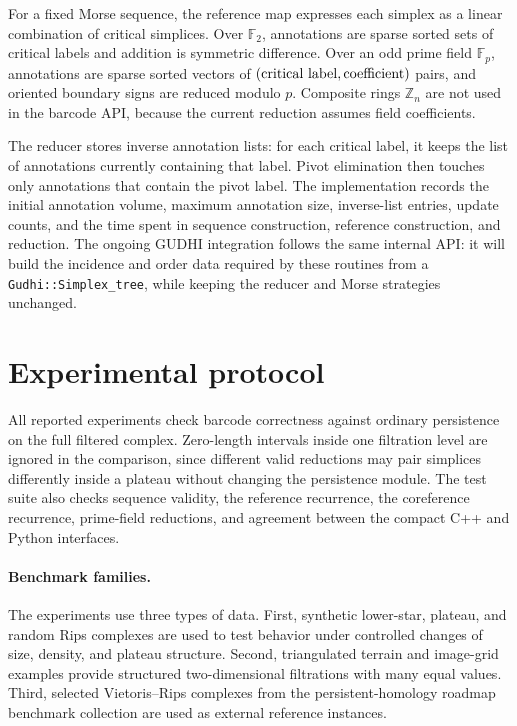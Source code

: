 For a fixed Morse sequence, the reference map expresses each simplex as a linear
combination of critical simplices.  Over $\mathbb{F}_2$, annotations are sparse sorted
sets of critical labels and addition is symmetric difference.  Over an odd prime field
$\mathbb{F}_p$, annotations are sparse sorted vectors of
$(\hbox{critical label},\hbox{coefficient})$ pairs, and oriented boundary signs are
reduced modulo $p$.  Composite rings $\mathbb{Z}_n$ are not used in the barcode API,
because the current reduction assumes field coefficients.

The reducer stores inverse annotation lists: for each critical label, it keeps the list of
annotations currently containing that label.  Pivot elimination then touches only
annotations that contain the pivot label.  The implementation records the initial
annotation volume, maximum annotation size, inverse-list entries, update counts, and the
time spent in sequence construction, reference construction, and reduction.  The ongoing
GUDHI integration follows the same internal API: it will build the incidence and order
data required by these routines from a \texttt{Gudhi::Simplex\_tree}, while keeping the
reducer and Morse strategies unchanged.

\section{Experimental protocol}
\label{sec:experimental-protocol}

All reported experiments check barcode correctness against ordinary persistence on the
full filtered complex.  Zero-length intervals inside one filtration level are ignored in
the comparison, since different valid reductions may pair simplices differently inside a
plateau without changing the persistence module.  The test suite also checks sequence
validity, the reference recurrence, the coreference recurrence, prime-field reductions,
and agreement between the compact C++ and Python interfaces.

\paragraph{Benchmark families.}
The experiments use three types of data.  First, synthetic lower-star, plateau, and random
Rips complexes are used to test behavior under controlled changes of size, density, and
plateau structure.  Second, triangulated terrain and image-grid examples provide
structured two-dimensional filtrations with many equal values.  Third, selected
Vietoris--Rips complexes from the persistent-homology roadmap benchmark collection are
used as external reference instances.


